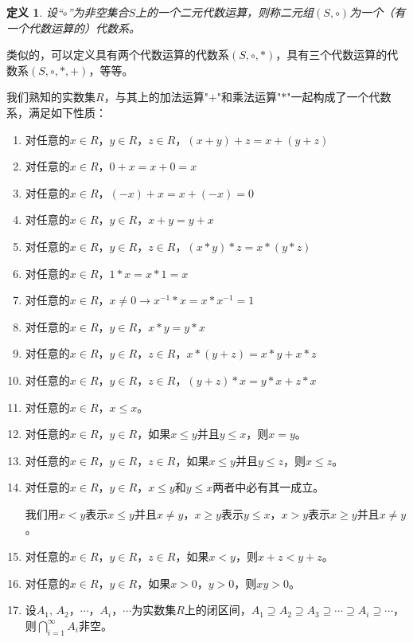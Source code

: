 \documentclass{article}
\newtheorem{Def}{定义}
\begin{document}
\begin{CJK*}{UTF8}{gbsn}
\begin{Def}
  设“$\circ$”为非空集合$S$上的一个二元代数运算，则称二元组$(S,\circ)$为一个（有一个代数运算的）代数系。
\end{Def}
类似的，可以定义具有两个代数运算的代数系$(S,\circ,*)$，具有三个代数运算的代数系$(S,\circ,*,+)$，等等。

我们熟知的实数集$R$，与其上的加法运算"$+$"和乘法运算"$*$"一起构成了一个代数系，满足如下性质：
   \begin{enumerate} 
   \item   对任意的$x\in R$，$y\in R$，$z\in R$，$(x + y) + z = x + (y + z)$
   \item   对任意的$x\in R$，$0 + x = x + 0 = x$
   \item   对任意的$x\in R$，$(-x) + x =x + (-x) = 0$
   \item   对任意的$x\in R$，$y\in R$，$x + y = y + x$ 
   \item   对任意的$x\in R$，$y\in R$，$z\in R$，$(x * y) * z = x * (y *z)$
   \item   对任意的$x\in R$，$1 * x = x * 1 = x$
   \item   对任意的$x\in R$，$x\neq 0 \to x^{-1} * x = x * x^{-1} = 1$
   \item   对任意的$x\in R$，$y\in R$，$x * y = y * x$
   \item   对任意的$x\in R$，$y\in R$，$z\in R$，$x* (y + z) = x * y + x * z$
   \item   对任意的$x\in R$，$y\in R$，$z\in R$，$(y + z) * x = y * x + z * x$
   \item 对任意的$x\in R$，$x\leq x$。
   \item 对任意的$x\in R$，$y\in R$，如果$x\leq y$并且$y\leq x$，则$x=y$。 
  \item 对任意的$x\in R$，$y\in R$，$z\in R$，如果$x\leq y$并且$y\leq z$，则$x\leq z$。
  \item 对任意的$x\in R$，$y\in R$，$x\leq y$和$y\leq x$两者中必有其一成立。
  
  我们用$x<y$表示$x\leq y$并且$x\neq y$，$x\geq y$表示$y\leq x$，$x > y$表示$x\geq y$并且$x\neq y$。
  
  \item 对任意的$x\in R$，$y\in R$，$z\in R$，如果$x<y$，则$x+z<y+z$。
  \item 对任意的$x\in R$，$y\in R$，如果$x>0$，$y>0$，则$xy>0$。
  \item 设$A_1$, $A_2$，$\cdots$，$A_i$，$\cdots$为实数集$R$上的闭区间，$A_1\supseteq A_2 \supseteq A_3 \supseteq \cdots \supseteq A_i \supseteq \cdots$，则$\bigcap_{i=1}^{\infty}A_i$非空。
  \end{enumerate}



\end{CJK*}
\end{document}
